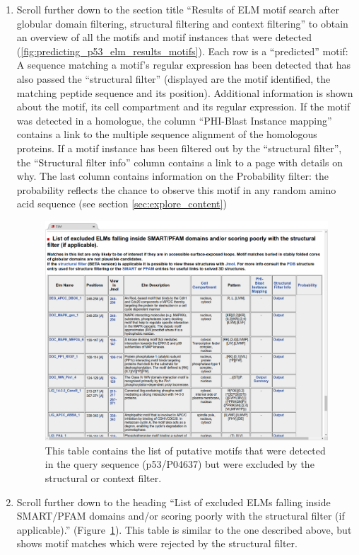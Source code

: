 \documentclass[12pt]{article}
\begin{document}
\begin{enumerate}
\item Scroll further down to the section title ``Results of ELM motif search
	after globular domain filtering, structural filtering and context
	filtering'' to obtain an overview of all the motifs and motif
	instances that were detected
	(\ref{fig:predicting_p53_elm_results_motifs}).
	Each row is a ``predicted'' motif: A sequence matching a
	motif's regular expression has been detected that has also passed the
	``structural filter'' (displayed are the motif identified, the matching peptide
	sequence and its position). Additional information is shown about the
	motif, its cell compartment and its regular expression. If the motif
	was detected in a homologue, the column ``PHI-Blast Instance
	mapping'' contains a link to the multiple sequence alignment of the
	homologous proteins. If a motif instance has been filtered out
	by the ``structural filter'', the ``Structural filter info'' column
	contains a link to a page with details on why.
	The last column contains information on the Probability filter: the
	probability reflects the chance to observe this motif in any random
	amino acid sequence (see section \ref{sec:explore_content})

\begin{figure}[h!]
\centering
	\includegraphics[width=\textwidth]{Figures/27_elm_results_motifs_filtered.png}
	\caption{
	This table contains the list of putative motifs that were detected in
	the query sequence (p53/P04637) but were excluded by the
	structural or context filter.
	}
	\label{fig:predicting_p53_elm_results_motifs_filtered}
\end{figure}

\item Scroll further down to the heading ``List of excluded ELMs falling inside
	SMART/PFAM domains and/or scoring poorly with the structural filter (if
	applicable).''
	(Figure~\ref{fig:predicting_p53_elm_results_motifs_filtered}).
	This table is similar to the one described above, but shows motif
	matches which were rejected by the structural filter.
\end{enumerate}
\end{document}

